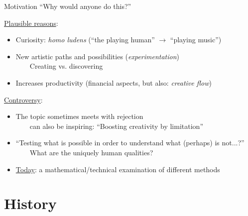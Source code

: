 \begin{frame}[t]{Motivation}
{\enquote{Why would anyone do this?}}

	
	\underline{Plausible reasons}:
	\begin{itemize}
		\item Curiosity: \emph{homo ludens} (\enquote{the playing human} $\to$ \enquote{playing music}) %
		\item New artistic paths and possibilities (\emph{experimentation})\\
		~~~\conclude~Creating vs. discovering \citep[p.591]{MDABook}
		\item Increases productivity (financial aspects, but also: \emph{creative flow})
	\end{itemize}
	\smallskip
	
	\underline{Controversy}:
	\begin{itemize}
		\item The topic sometimes meets with rejection\\
		~~~\conclude~can also be inspiring: \enquote{Boosting creativity by limitation}
		\item \enquote{Testing what is possible in order to understand what (perhaps) is not...?} \\
		~~~\conclude~What are the uniquely human qualities?
		\medskip
		\item[\Conclude] \underline{Today}: a mathematical/technical examination of different methods
	\end{itemize}
	
\end{frame}

\section{History}

